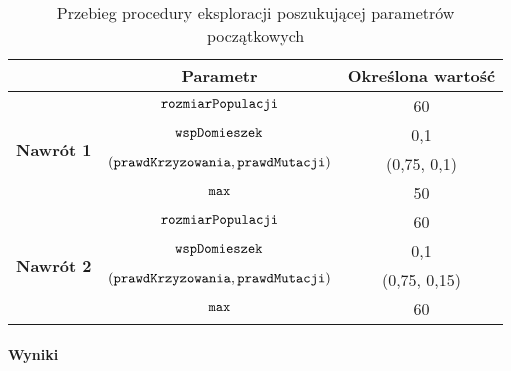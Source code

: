 \documentclass[./FM_mgr.tex]{subfiles}
\begin{document}

\begin{table}[h]
	\caption{Przebieg procedury eksploracji poszukującej parametrów początkowych \label{table:knapsack_tweak_flow}}
	\centering
	\begin{tabular}{c|c|c|}
		\cline{2-3}
		& {\bf Parametr}                                     & {\bf Określona wartość} \\ \hline
		\multicolumn{1}{|c|}{\multirow{4}{*}{{\bf Nawrót 1}}} & $\mathtt{rozmiarPopulacji}$                         & 60                      \\ \cline{2-3} 
		\multicolumn{1}{|c|}{}                                & $\mathtt{wspDomieszek}$                             & 0,1                     \\ \cline{2-3} 
		\multicolumn{1}{|c|}{}                                & $(\mathtt{prawdKrzyzowania}, \mathtt{prawdMutacji})$ & (0,75, 0,1)             \\ \cline{2-3} 
		\multicolumn{1}{|c|}{}                                & $\mathtt{max}$                                      & 50                     \\ \hline \hline
		\multicolumn{1}{|c|}{\multirow{4}{*}{{\bf Nawrót 2}}} & $\mathtt{rozmiarPopulacji}$                         & 60                      \\ \cline{2-3} 
		\multicolumn{1}{|c|}{}                                & $\mathtt{wspDomieszek}$                             & 0,1                     \\ \cline{2-3} 
		\multicolumn{1}{|c|}{}                                & $(\mathtt{prawdKrzyzowania}, \mathtt{prawdMutacji})$ & (0,75, 0,15)             \\ \cline{2-3} 
		\multicolumn{1}{|c|}{}                                & $\mathtt{max}$                                      & 60                     \\ \hline
	\end{tabular}
\end{table}	

\paragraph{Wyniki}
\end{document}
